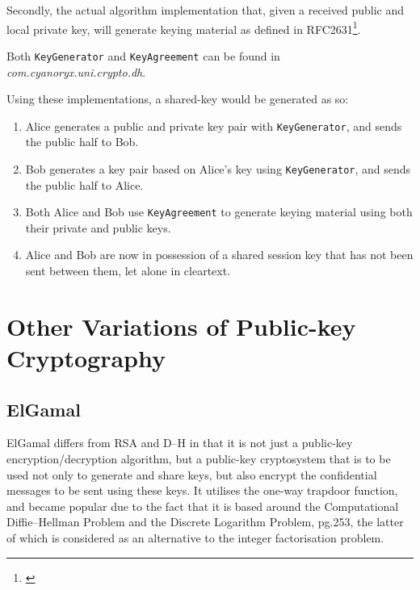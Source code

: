      
    
    Secondly, the actual algorithm implementation that, given a received public and local private key, will generate keying material as defined in RFC2631\footnote{\cite{Rescorla:1999aa}}.
    
    
    
    Both \verb!KeyGenerator! and \verb!KeyAgreement! can be found in \emph{com.cyanoryx.uni.crypto.dh}.
    
    Using these implementations, a shared-key would be generated as so:
    
    \begin{enumerate}
      \item Alice generates a public and private key pair with \verb!KeyGenerator!, and sends the public half to Bob.
      \item Bob generates a key pair based on Alice's key using \verb!KeyGenerator!, and sends the public half to Alice.
      \item Both Alice and Bob use \verb!KeyAgreement! to generate keying material using both their private and public keys.
      \item Alice and Bob are now in possession of a shared session key that has not been sent between them, let alone in cleartext.
    \end{enumerate}
  
\section{Other Variations of Public-key Cryptography}

  \subsection{ElGamal}
  
  ElGamal differs from RSA and D--H in that it is not just a public-key encryption/decryption algorithm, but a public-key cryptosystem that is to be used not only to generate and share keys, but also encrypt the confidential messages to be sent using these keys. It utilises the one-way trapdoor function, and became popular due to the fact that it is based around the Computational Diffie--Hellman Problem and the Discrete Logarithm Problem, \cite{Mao:2003uq} \textsection pg.253, the latter of which is considered as an alternative to the integer factorisation problem.
  
